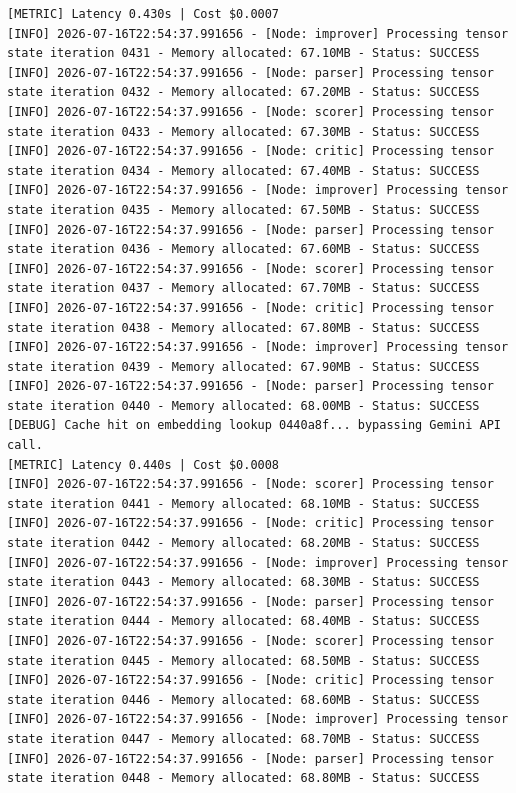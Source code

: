 \documentclass[10pt,journal,compsoc]{IEEEtran}
\begin{document}
\begin{verbatim}
[METRIC] Latency 0.430s | Cost $0.0007
[INFO] 2026-07-16T22:54:37.991656 - [Node: improver] Processing tensor state iteration 0431 - Memory allocated: 67.10MB - Status: SUCCESS
[INFO] 2026-07-16T22:54:37.991656 - [Node: parser] Processing tensor state iteration 0432 - Memory allocated: 67.20MB - Status: SUCCESS
[INFO] 2026-07-16T22:54:37.991656 - [Node: scorer] Processing tensor state iteration 0433 - Memory allocated: 67.30MB - Status: SUCCESS
[INFO] 2026-07-16T22:54:37.991656 - [Node: critic] Processing tensor state iteration 0434 - Memory allocated: 67.40MB - Status: SUCCESS
[INFO] 2026-07-16T22:54:37.991656 - [Node: improver] Processing tensor state iteration 0435 - Memory allocated: 67.50MB - Status: SUCCESS
[INFO] 2026-07-16T22:54:37.991656 - [Node: parser] Processing tensor state iteration 0436 - Memory allocated: 67.60MB - Status: SUCCESS
[INFO] 2026-07-16T22:54:37.991656 - [Node: scorer] Processing tensor state iteration 0437 - Memory allocated: 67.70MB - Status: SUCCESS
[INFO] 2026-07-16T22:54:37.991656 - [Node: critic] Processing tensor state iteration 0438 - Memory allocated: 67.80MB - Status: SUCCESS
[INFO] 2026-07-16T22:54:37.991656 - [Node: improver] Processing tensor state iteration 0439 - Memory allocated: 67.90MB - Status: SUCCESS
[INFO] 2026-07-16T22:54:37.991656 - [Node: parser] Processing tensor state iteration 0440 - Memory allocated: 68.00MB - Status: SUCCESS
[DEBUG] Cache hit on embedding lookup 0440a8f... bypassing Gemini API call.
[METRIC] Latency 0.440s | Cost $0.0008
[INFO] 2026-07-16T22:54:37.991656 - [Node: scorer] Processing tensor state iteration 0441 - Memory allocated: 68.10MB - Status: SUCCESS
[INFO] 2026-07-16T22:54:37.991656 - [Node: critic] Processing tensor state iteration 0442 - Memory allocated: 68.20MB - Status: SUCCESS
[INFO] 2026-07-16T22:54:37.991656 - [Node: improver] Processing tensor state iteration 0443 - Memory allocated: 68.30MB - Status: SUCCESS
[INFO] 2026-07-16T22:54:37.991656 - [Node: parser] Processing tensor state iteration 0444 - Memory allocated: 68.40MB - Status: SUCCESS
[INFO] 2026-07-16T22:54:37.991656 - [Node: scorer] Processing tensor state iteration 0445 - Memory allocated: 68.50MB - Status: SUCCESS
[INFO] 2026-07-16T22:54:37.991656 - [Node: critic] Processing tensor state iteration 0446 - Memory allocated: 68.60MB - Status: SUCCESS
[INFO] 2026-07-16T22:54:37.991656 - [Node: improver] Processing tensor state iteration 0447 - Memory allocated: 68.70MB - Status: SUCCESS
[INFO] 2026-07-16T22:54:37.991656 - [Node: parser] Processing tensor state iteration 0448 - Memory allocated: 68.80MB - Status: SUCCESS

\end{verbatim}
\end{document}
